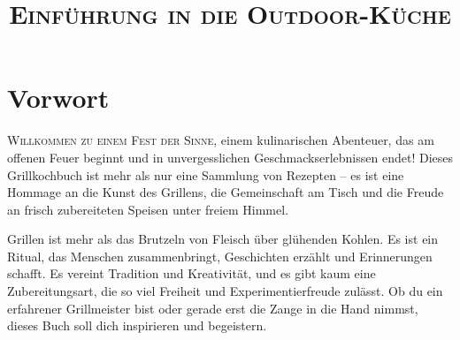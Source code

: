 \documentclass[pdftext, bcor=7mm, ngerman]{scrbook}
\begin{document}





\begin{titlepage}
	\subject{\huge\textsc{Kochen in kurzen Hosen}}
	\title{\Huge\textrm{\textsc{Einführung in die Outdoor-Küche}}}
    \date{}
\end{titlepage}
\dedication{Für meine Familie und lieben Freunde, \\
die mutig und selbstlos die neusten Kreationen kosten\\}

\maketitle



\frontmatter




\chapter{Vorwort}
\lettrine[lines=3]{W}{illkommen zu einem Fest der Sinne,} einem kulinarischen Abenteuer, das am offenen Feuer beginnt und in 
unvergesslichen Geschmackserlebnissen endet! Dieses Grillkochbuch ist mehr als nur eine Sammlung von Rezepten – es ist eine 
Hommage an die Kunst des Grillens, die Gemeinschaft am Tisch und die Freude an frisch zubereiteten Speisen unter freiem Himmel.

Grillen ist mehr als das Brutzeln von Fleisch über glühenden Kohlen. Es ist ein Ritual, das Menschen zusammenbringt, Geschichten 
erzählt und Erinnerungen schafft. Es vereint Tradition und Kreativität, und es gibt kaum eine Zubereitungsart, die so viel Freiheit und 
Experimentierfreude zulässt. Ob du ein erfahrener Grillmeister bist oder gerade erst die Zange in die Hand nimmst, dieses Buch soll dich 
inspirieren und begeistern.
\end{document}

